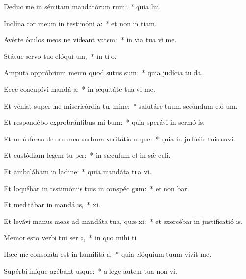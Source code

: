 \item Deduc me in sémitam mandatórum rum:~* quia  lui.
\item Inclína cor meum in testimóni a:~* et non in tiam.
\item Avérte óculos meos ne vídeant vatem:~* in via tua vi me.
\item Státue servo tuo elóqui um,~* in ti o.
\item Amputa oppróbrium meum quod sutus sum:~* quia judícia tu da.
\item Ecce concupívi mandá a:~* in æquitáte tua vi me.
\item Et véniat super me misericórdia tu, mine:~* salutáre tuum secúndum eló um.
\item Et respondébo exprobrántibus mi bum:~* quia sperávi in sermó is.
\item Et ne áuferas de ore meo verbum veritátis usque:~* quia in judíciis tuis suvi.
\item Et custódiam legem tu per:~* in sǽculum et in sǽ culi.
\item Et ambulábam in ladine:~* quia mandáta tua vi.
\item Et loquébar in testimóniis tuis in conspéc gum:~* et non bar.
\item Et meditábar in mandá is,~*  xi.
\item Et levávi manus meas ad mandáta tua, quæ xi:~* et exercébar in justificatió is.
\item Memor esto verbi tui ser o,~* in quo mihi  ti.
\item Hæc me consoláta est in humilitá a:~* quia elóquium tuum vivit me.
\item Supérbi iníque agébant usque:~* a lege autem tua non vi.
